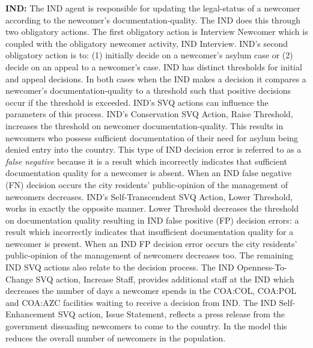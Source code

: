 \documentclass{scspaperproc}
\theoremstyle{scsthe}
\begin{document}
{\bf IND:} The IND agent is responsible for updating the legal-status of a newcomer according to the newcomer's documentation-quality. The IND does this through two obligatory actions. The first obligatory action is Interview Newcomer which is coupled with the obligatory newcomer activity, IND Interview. IND's second obligatory action is to: (1) initially decide on a newcomer's asylum case or (2) decide on an appeal to a newcomer's case. IND has distinct thresholds for initial and appeal decisions. In both cases when the IND makes a decision it compares a newcomer's documentation-quality to a threshold such that positive decisions occur if the threshold is exceeded. IND's SVQ actions can influence the parameters of this process. IND's Conservation SVQ Action, Raise Threshold, increases the threshold on newcomer documentation-quality. This results in newcomers who possess sufficient documentation of their need for asylum being denied entry into the country. This type of IND decision error is referred to as a \emph{false negative} because it is a result which incorrectly indicates that sufficient documentation quality for a newcomer is absent. When an IND false negative (FN) decision occurs the city residents' public-opinion of the management of newcomers decreases. IND's Self-Transcendent SVQ Action, Lower Threshold, works in exactly the opposite manner. Lower Threshold decreases the threshold on documentation quality resulting in IND false positive (FP) decision errors: a result which incorrectly indicates that insufficient documentation quality for a newcomer is present. When an IND FP decision error occurs the city residents' public-opinion of the management of newcomers decreases too. The remaining IND SVQ actions also relate to the decision process. The IND Openness-To-Change SVQ action, Increase Staff, provides additional staff at the IND which decreases the number of days a newcomer spends in the COA:COL, COA:POL and COA:AZC facilities waiting to receive a decision from IND. The IND Self-Enhancement SVQ action, Issue Statement, reflects a press release from the government dissuading newcomers to come to the country. In the model this reduces the overall number of newcomers in the population.
\end{document}
